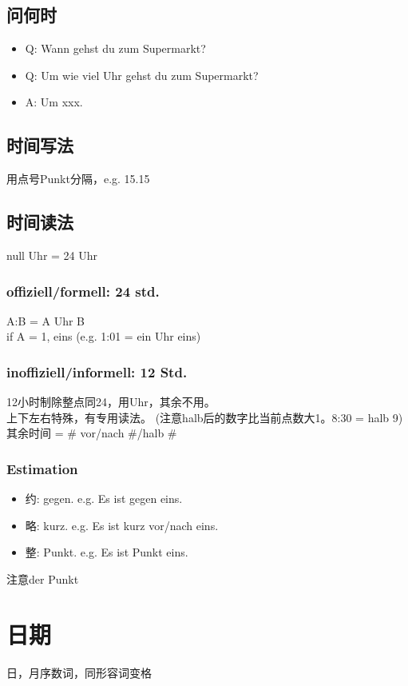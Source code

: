 \subsection{问何时}
\begin{itemize}
    \item Q: Wann gehst du zum Supermarkt?
    \item Q: Um wie viel Uhr gehst du zum Supermarkt?
    \item A: Um xxx.
\end{itemize}

\subsection{时间写法}
用点号Punkt分隔，e.g. 15.15
\subsection{时间读法}
null Uhr = 24 Uhr
\subsubsection{offiziell/formell: 24 std.}
A:B = A Uhr B\\
if A = 1, eins  (e.g. 1:01 = ein Uhr eins) \\
\subsubsection{inoffiziell/informell: 12 Std.}
\begin{center}
    \clock[hand=false]
\end{center}
12小时制除整点同24，用Uhr，其余不用。 \\
上下左右特殊，有专用读法。 (注意halb后的数字比当前点数大1。8:30 = halb 9)\\
其余时间 = \# vor/nach \#/halb \# \\
\subsubsection{Estimation}
\begin{itemize}
    \item 约: gegen. e.g. Es ist gegen eins.
    \item 略: kurz. e.g. Es ist kurz vor/nach eins.
    \item 整: Punkt. e.g. Es ist Punkt eins.
\end{itemize}
注意der Punkt \sqr[color=green]

\section{日期}
日，月序数词，同形容词变格
